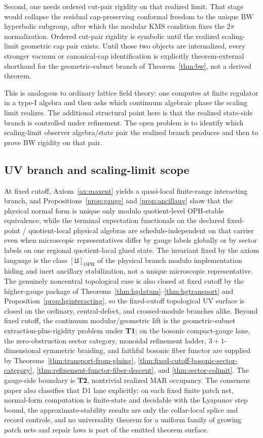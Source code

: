 \documentclass[11pt]{article}
\begin{document}
Second, one needs ordered cut-pair rigidity on that realized limit. That stage would collapse the residual cap-preserving conformal freedom to the unique BW hyperbolic subgroup, after which the modular KMS condition fixes the \(2\pi\) normalization. Ordered cut-pair rigidity is symbolic until the realized scaling-limit geometric cap pair exists. Until those two objects are internalized, every stronger vacuum or canonical-cap identification is explicitly theorem-external shorthand for the geometric-subnet branch of Theorem~\ref{thm:bw}, not a derived theorem.

This is analogous to ordinary lattice field theory: one computes at finite regulator in a type-I algebra and then asks which continuum algebraic phase the scaling limit realizes. The additional structural point here is that the realized state-side branch is controlled under refinement. The open problem is to identify which scaling-limit observer algebra/state pair the realized branch produces and then to prove BW rigidity on that pair.
\subsection{UV branch and scaling-limit scope}

At fixed cutoff, Axiom~\ref{ax:maxent} yields a quasi-local finite-range interacting branch, and Propositions~\ref{prop:gauge} and \ref{prop:ancillauv} show that the physical normal form is unique only modulo quotient-level OPH-stable equivalence, while the terminal expectation functionals on the declared fixed-point / quotient-local physical algebras are schedule-independent on that carrier even when microscopic representatives differ by gauge labels globally or by sector labels on one regional quotient-local glued state. The invariant fixed by the axiom language is the class \([\mathfrak U]_{\mathrm{OPH}}\) of the physical branch modulo implementation hiding and inert ancillary stabilization, not a unique microscopic representative. The genuinely noncentral topological case is also closed at fixed cutoff by the higher-gauge package of Theorems~\ref{thm:hgdatum}--\ref{thm:hgtransport} and Proposition~\ref{prop:hginteracting}, so the fixed-cutoff topological UV surface is closed on the ordinary, central-defect, and crossed-module branches alike. Beyond fixed cutoff, the continuum modular/geometric lift is the geometric-subnet extraction-plus-rigidity problem under \textbf{T1}; on the bosonic compact-gauge lane, the zero-obstruction sector category, monoidal refinement ladder, \(3+1\)-dimensional symmetric braiding, and faithful bosonic fiber functor are supplied by Theorems~\ref{thm:transport-from-gluing}, \ref{thm:fixed-cutoff-bosonic-sector-category}, \ref{thm:refinement-functor-fiber-descent}, and \ref{thm:sector-colimit}. The gauge-side boundary is \textbf{T2}, nontrivial realized MAR occupancy.
The consensus paper also classifies that D1 lane explicitly: on each fixed finite patch net,
normal-form computation is finite-state and decidable with the Lyapunov step bound, the
approximate-stability results are only the collar-local splice and record controls, and no
universality theorem for a uniform family of growing patch nets and repair laws is part of the
emitted theorem surface.
\end{document}
